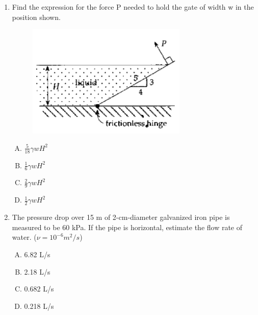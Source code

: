 \documentclass[12pt]{article}
\begin{document}
\begin{enumerate}
\clearpage



\item Find the expression for the force P needed to hold the gate of width w in the position shown.

\begin{figure}[htbp] %
   \centering
   \includegraphics[width=3in]{gate.png} 
   \caption{}
   \label{fig:gate}
\end{figure}

\begin{enumerate}[A)]
\item $\frac{5}{18}\gamma w H^2$
\item $\frac{1}{6} \gamma w H^2$
\item $\frac{2}{9} \gamma w H^2$
\item $\frac{1}{2} \gamma w H^2$
\end{enumerate}

\clearpage

\item The pressure drop over 15 m of 2-cm-diameter galvanized iron pipe is measured
to be 60 kPa. If the pipe is horizontal, estimate the flow rate of water. ($\nu = 10^{-6}
m^2/s$)
\begin{enumerate}[A)]
\item 6.82 L/s
\item 2.18 L/s
\item 0.682 L/s
\item 0.218 L/s
\end{enumerate}

\clearpage



\end{enumerate}
\end{document}
